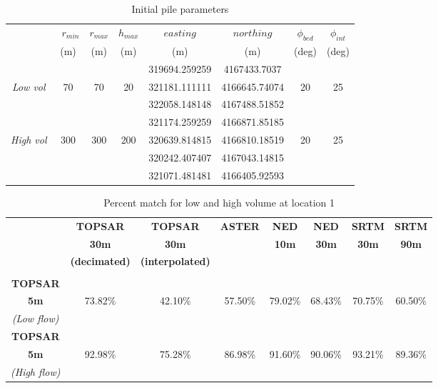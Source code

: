 \documentclass[12pt,letterpaper]{article}
\begin{document}
  \begin{table}[H]
    \caption{Initial pile parameters }
    \begin{tabular}{|c||c|c|c||c|c||c|c|}
      \hline
      &\ $r_{min}$ & $r_{max}$ & $h_{max}$ & $easting$ & $northing$ & $\phi_{bed}$ & $\phi_{int}$  \\
      &(m)&(m)&(m)&(m)&(m)&(deg)&(deg) \\
      \hline
      &&&&319694.259259&4167433.7037&& \\
      \textit{Low vol} & 70 & 70 & 20 & 321181.111111 &4166645.74074 & 20 & 25 \\
      &&&&322058.148148&4167488.51852&& \\
      \cline{1-4} \cline{7-8}
      &&&&321174.259259&4166871.85185&& \\
      \textit{High vol} & 300 & 300 & 200 &320639.814815  & 4166810.18519 & 20 & 25 \\
      &&&&320242.407407&4167043.14815&& \\
      &&&&321071.481481&4166405.92593&& \\
      \hline
    \end{tabular}
    \label{tab:Table2}
  \end{table}

\begin{landscape}
  \begin{table}[H]
    \caption{Percent  match for low and high volume at location 1 }
    \begin{tabular}{cccccccc}
      \hline
      &\textbf{TOPSAR}&\textbf{TOPSAR}&\textbf{ASTER}&\textbf{NED}&\textbf{NED}&\textbf{SRTM}&\textbf{SRTM}\\
      &\textbf{30m}&\textbf{30m}&&\textbf{10m}&\textbf{ 30m}& \textbf{30m}&\textbf{90m}\\
      &\textbf{(decimated)}&\textbf{(interpolated)}&&&&&\\
      \hline
      &&&&&&& \\
      \textbf{TOPSAR}&&&&&&& \\
      \textbf{5m}&73.82\%&42.10\%&57.50\%&79.02\%&68.43\%&70.75\%&60.50\% \\
      \textit{(Low flow)}&&&&&&&\\
      \hline
      \hline
      \textbf{TOPSAR}&&&&&&& \\
      \textbf{5m}&92.98\%&75.28\%&86.98\%&91.60\%&90.06\%&93.21\%&89.36\% \\
      \textit{(High flow)}&&&&&&& \\
      \hline
    \end{tabular}
    \label{tab:Table3}
  \end{table}
\end{landscape}
\end{document}
